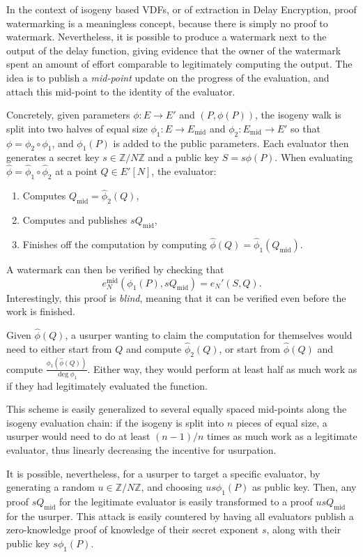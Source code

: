 \documentclass{llncs}
\newcommand{\Z}{\mathbb{Z}}
\newcommand{\Emid}{E_\mathrm{mid}}
\newcommand{\Qmid}{Q_\mathrm{mid}}
\begin{document}
In the context of isogeny based VDFs, or of extraction in Delay
Encryption, proof watermarking is a meaningless concept, because there
is simply no proof to watermark. %
Nevertheless, it is possible to produce a watermark next to the output
of the delay function, giving evidence that the owner of the watermark
spent an amount of effort comparable to legitimately computing the
output. %
The idea is to publish a \emph{mid-point} update on the progress of
the evaluation, and attach this mid-point to the identity of the
evaluator.

Concretely, given parameters $\phi:E\to E'$ and $(P,\phi(P))$, the
isogeny walk is split into two halves of equal size
$\phi_1:E\to \Emid$ and $\phi_2:\Emid\to E'$ so that
$\phi=\phi_2\circ\phi_1$, and $\phi_1(P)$ is added to the public parameters. %
Each evaluator then generates a secret key $s\in\Z/N\Z$ and a public
key $S = s \phi(P)$. %
When evaluating $\hat\phi=\hat\phi_1\circ\hat\phi_2$ at a point
$Q\in E'[N]$, the evaluator:
\begin{enumerate}
\item Computes $\Qmid=\hat\phi_2(Q)$,
\item Computes and publishes $s\Qmid$,
\item Finishes off the computation by computing
  $\hat\phi(Q)=\hat\phi_1(\Qmid)$.
\end{enumerate}
A watermark can then be verified by checking that
\[e_N^\mathrm{mid}(\phi_1(P),s\Qmid) = e_N'(S,Q).\]
Interestingly, this proof is \emph{blind}, meaning that it can be
verified even before the work is finished.

Given $\hat\phi(Q)$, a usurper wanting to claim the computation for
themselves would need to either start from $Q$ and compute
$\hat\phi_2(Q)$, or start from $\hat\phi(Q)$ and compute
$\frac{\phi_1(\hat\phi(Q))}{\deg\phi_1}$. %
Either way, they would perform at least half as much work as if they
had legitimately evaluated the function.

This scheme is easily generalized to several equally spaced mid-points
along the isogeny evaluation chain: if the isogeny is split into $n$
pieces of equal size, a usurper would need to do at least $(n-1)/n$
times as much work as a legitimate evaluator, thus linearly decreasing
the incentive for usurpation.

It is possible, nevertheless, for a usurper to
target a specific evaluator, by generating a random $u\in\Z/N\Z$, and
choosing $us\phi_1(P)$ as public key. %
Then, any proof $s\Qmid$ for the legitimate evaluator is easily
transformed to a proof $us\Qmid$ for the usurper. %
This attack is easily countered by having all evaluators publish a
zero-knowledge proof of knowledge of their secret exponent $s$, along
with their public key $s\phi_1(P)$. %
\end{document}
